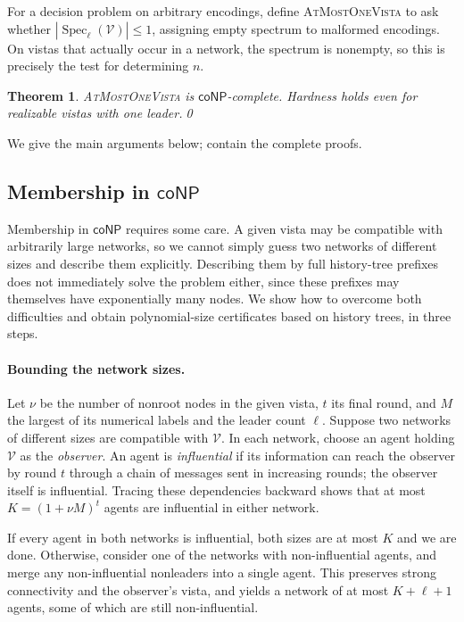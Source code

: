 \documentclass[11pt]{article}
\newtheorem{theorem}{Theorem}
\begin{document}
For a decision problem on arbitrary encodings, define
\textsc{AtMostOneVista} to ask whether
\(|\operatorname{Spec}_{\ell}(\mathcal V)|\leq1\), assigning empty
spectrum to malformed encodings. On vistas that actually occur in
a network, the spectrum is nonempty, so this is precisely the
test for determining \(n\).

\begin{theorem}
\label{thm:main-conp-complete}
\textnormal{\textsc{AtMostOneVista}} is \(\mathsf{coNP}\)-complete.
Hardness holds even for realizable vistas with one leader.\qed
\end{theorem}

We give the main arguments below; 
contain the complete proofs.

\subsection{Membership in \texorpdfstring{\(\mathsf{coNP}\)}{coNP}}
\label{sec:conp-membership}

Membership in \(\mathsf{coNP}\) requires some care. A given vista may be compatible with arbitrarily large networks, so we cannot simply guess two networks of different sizes and describe them explicitly. Describing them by full history-tree prefixes does not immediately solve the problem either, since these prefixes may themselves have exponentially many nodes. We show how to overcome both difficulties and obtain polynomial-size certificates based on history trees, in three steps.

\paragraph{Bounding the network sizes.}
Let $\nu$ be the number of nonroot nodes in the given vista, $t$ its final round,
and $M$ the largest of its numerical labels and the leader count $\ell$.
Suppose two networks of different sizes are compatible with $\mathcal V$.
In each network, choose an agent holding $\mathcal V$ as the
\emph{observer}. An agent is \emph{influential} if its information
can reach the observer by round $t$ through a chain of messages
sent in increasing rounds; the observer itself is influential.
Tracing these dependencies backward shows that at most
$K=(1+\nu M)^t$ agents are influential in either network.

If every agent in both networks is influential, both sizes are
at most $K$ and we are done. Otherwise, consider one of the networks
with non-influential agents, and merge any non-influential nonleaders into a single agent. This preserves strong connectivity and the observer's vista, and yields a network of at most \(K+\ell+1\) agents, some of which are still non-influential.
\end{document}
